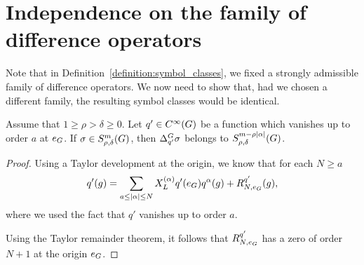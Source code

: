 \section{Independence on the family of difference operators}

Note that in Definition~\ref{definition:symbol_classes},
we fixed a strongly admissible family of difference operators.
We now need to show that,
had we chosen a different family,
the resulting symbol classes would be identical.

\begin{proposition}
    Assume that $1 \geq \rho > \delta \geq 0$.
    Let $q' \in {C^\infty(G)}$ be a function which vanishes up to order $a$ at $e_G$.
    If $\sigma \in S^{m}_{\rho, \delta}(G)$,
    then ${\Delta^{G}_{q'}} \sigma$ belongs to $S^{m - \rho \left|{\alpha}\right|}_{\rho, \delta}(G)$.
\end{proposition}
\begin{proof}
    Using a Taylor development at the origin,
    we know that for each $N \geq a$
    \begin{align*}
        q'(g) = \sum_{a \leq \left|{\alpha}\right| \leq N} X^{(\alpha)}_L q'(e_G) q^\alpha(g) + R^{q'}_{N, e_G}(g),
    \end{align*}
    where we used the fact that $q'$ vanishes up to order $a$.

    Using the Taylor remainder theorem,
    it follows that $R^{q'}_{N, e_G}$ has a zero of order $N + 1$ at the origin $e_G$.
\end{proof}

